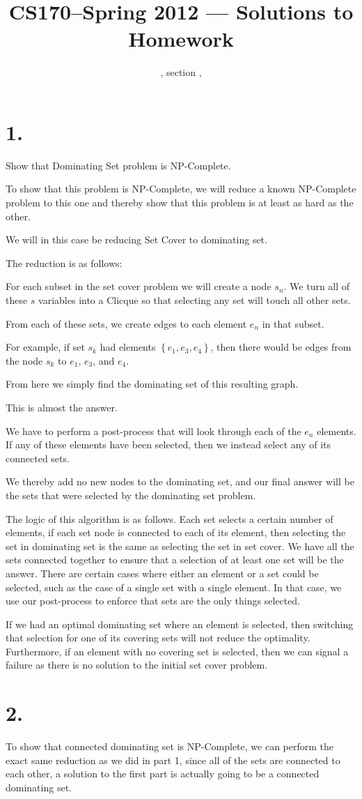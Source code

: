 \documentclass[11pt]{article}
\title{CS170--Spring 2012 --- Solutions to Homework \HW}
\author{\Name, section \Sec, \texttt{\Login}}
\begin{document}
\maketitle

\section*{1.}
Show that Dominating Set problem is NP-Complete.

To show that this problem is NP-Complete, we will reduce a known NP-Complete
problem to this one and thereby show that this problem is at least as hard as
the other. 

We will in this case be reducing Set Cover to dominating set.

The reduction is as follows:

For each subset in the set cover problem we will create a node $s_n$. We turn
all of these $s$ variables into a Clicque so that selecting any set will touch
all other sets. 

From each of these sets, we create edges to each element $e_n$ in that subset. 

For example, if set $s_k$ had elements $\left\{ e_1, e_3, e_4 \right\}$, then
there would be edges from the node $s_k$ to $e_1$, $e_3$, and $e_4$.

From here we simply find the dominating set of this resulting graph. 

This is almost the answer. 

We have to perform a post-process that will look through each of the $e_n$
elements. If any of these elements have been selected, then we instead select
any of its connected sets. 

We thereby add no new nodes to the dominating set, and our final answer will be
the sets that were selected by the dominating set problem.


The logic of this algorithm is as follows. Each set selects a certain number of
elements, if each set node is connected to each of its element, then selecting
the set in dominating set is the same as selecting the set in set cover. We
have all the sets connected together to ensure that a selection of at least one
set will be the answer. There are certain cases where either an element or a
set could be selected, such as the case of a single set with a single element.
In that case, we use our post-process to enforce that sets are the only things
selected. 

If we had an optimal dominating set where an element is selected, then
switching that selection for one of its covering sets will not reduce the
optimality. Furthermore, if an element with no covering set is selected, then
we can signal a failure as there is no solution to the initial set cover
problem.
\newpage
\section*{2.}
To show that connected dominating set is NP-Complete, we can perform the exact
same reduction as we did in part 1, since all of the sets are connected to each
other, a solution to the first part is actually going to be a connected
dominating set. 
\end{document}
